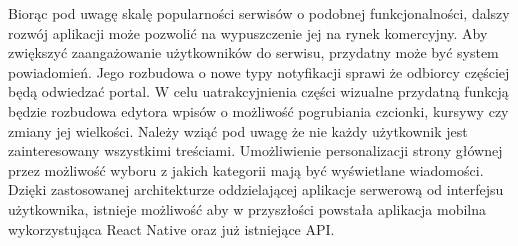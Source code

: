 \documentclass[declaration,shortabstract]{iithesis}
\begin{document}
Biorąc pod uwagę skalę popularności serwisów o podobnej funkcjonalności, dalszy rozwój aplikacji może pozwolić na wypuszczenie jej na rynek komercyjny. Aby zwiększyć zaangażowanie użytkowników do serwisu, przydatny może być system powiadomień. Jego rozbudowa o nowe typy notyfikacji sprawi że odbiorcy częściej będą odwiedzać portal. W celu uatrakcyjnienia części wizualne przydatną funkcją będzie rozbudowa edytora wpisów o możliwość pogrubiania czcionki, kursywy czy zmiany jej wielkości. Należy wziąć pod uwagę że nie każdy użytkownik jest zainteresowany wszystkimi treściami. Umożliwienie personalizacji strony głównej przez możliwość wyboru z jakich kategorii mają być wyświetlane wiadomości. Dzięki zastosowanej architekturze oddzielającej aplikacje serwerową od interfejsu użytkownika, istnieje możliwość aby w przyszłości powstała aplikacja mobilna wykorzystująca React Native oraz już istniejące API.



\end{document}

